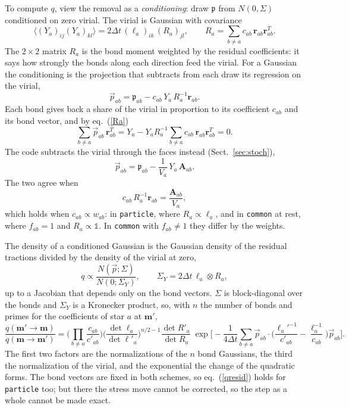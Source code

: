 \documentclass[11pt,aps,preprint,nofootinbib,superscriptaddress,tightenlines]{revtex4-2}
\newcommand{\one}{\mathds{1}}
\def\st{\begin{equation}}
\def\stp{\end{equation}}
\def\Eq#1{eq.~(\ref{#1})}
\def\Sect#1{Sect.~\ref{#1}}
\begin{document}
To compute $q$, view the removal as a \emph{conditioning}: draw $\mathfrak p$ from $N(0,\Sigma)$ conditioned on zero virial.  The
virial is Gaussian with covariance
\st
\big\langle (Y_a)_{ij}(Y_a)_{kl}\big\rangle=2\Delta t\,(\ell_a)_{ik}\,(R_a)_{jl},\qquad
R_a=\sum_{b\neq a}c_{ab}\,\bm r_{ab}\bm r_{ab}^T .
\label{Ra}
\stp
The $2\times2$ matrix $R_a$ is the bond moment weighted by the residual coefficients: it says how strongly the bonds along
each direction feed the virial.  For a Gaussian the conditioning is the projection that subtracts from each draw its regression
on the virial,
\st
\vec p_{ab}=\mathfrak p_{ab}-c_{ab}\,Y_a\,R_a^{-1}\bm r_{ab} .
\label{condition}
\stp
Each bond gives back a share of the virial in proportion to its coefficient $c_{ab}$ and its bond vector, and by \Eq{Ra}
\st
\sum_{b\neq a}\vec p_{ab}\,\bm r_{ab}^T=Y_a-Y_aR_a^{-1}\sum_{b\neq a}c_{ab}\,\bm r_{ab}\bm r_{ab}^T=0 .
\stp
The code subtracts the virial through the faces instead (\Sect{sec:stoch}),
\st
\vec p_{ab}=\mathfrak p_{ab}-\frac1{V_a}\,Y_a\,\bm A_{ab} .
\stp
The two agree when
\st
c_{ab}\,R_a^{-1}\bm r_{ab}=\frac{\bm A_{ab}}{V_a} ,
\stp
which holds when $c_{ab}\propto w_{ab}$: in \texttt{particle}, where $R_a\propto\ell_a$, and in \texttt{common} at rest, where $f_{ab}=1$ and
$R_a\propto\one$.  In \texttt{common} with $f_{ab}\neq1$ they differ by the weights.

The density of a conditioned Gaussian is the Gaussian density of the residual tractions divided by the density of the virial at
zero,
\st
q\propto\frac{N(\vec p;\Sigma)}{N(0;\Sigma_Y)},\qquad \Sigma_Y=2\Delta t\,\ell_a\otimes R_a ,
\stp
up to a Jacobian that depends only on the bond vectors.  $\Sigma$ is block-diagonal over the bonds and $\Sigma_Y$ is a Kronecker
product, so, with $n$ the number of bonds and primes for the coefficients of star $a$ at $\bm m'$,
\st
\frac{q(\bm m'\to\bm m)}{q(\bm m\to\bm m')}
=\Big(\prod_{b\neq a}\frac{c_{ab}}{c'_{ab}}\Big)\Big(\frac{\det\ell_a}{\det\ell'_a}\Big)^{n/2-1}\frac{\det R'_a}{\det R_a}\;
\exp\Big[-\frac{1}{4\Delta t}\sum_{b\neq a}\vec p_{ab}\cdot\Big(\frac{\ell_a'^{-1}}{c'_{ab}}-\frac{\ell_a^{-1}}{c_{ab}}\Big)\vec p_{ab}\Big] .
\label{qresid}
\stp
The first two factors are the normalizations of the $n$ bond Gaussians, the third the normalization of the virial, and the
exponential the change of the quadratic forms.  The bond vectors are fixed in both schemes, so \Eq{qresid} holds for
\texttt{particle} too; but there the stress move cannot be corrected, so the step as a whole cannot be made exact.
\end{document}
